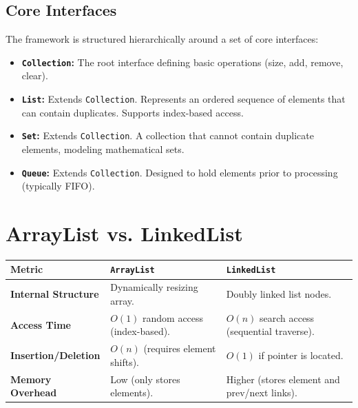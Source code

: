 \documentclass[12pt,a4paper]{article}
\renewcommand{\arraystretch}{1.45}
\begin{document}
\subsection{Core Interfaces}
The framework is structured hierarchically around a set of core interfaces:
\begin{itemize}[leftmargin=*, itemsep=4pt]
  \item \textbf{\texttt{Collection}:} The root interface defining basic operations (size, add, remove, clear).
  \item \textbf{\texttt{List}:} Extends \texttt{Collection}. Represents an ordered sequence of elements that can contain duplicates. Supports index-based access.
  \item \textbf{\texttt{Set}:} Extends \texttt{Collection}. A collection that cannot contain duplicate elements, modeling mathematical sets.
  \item \textbf{\texttt{Queue}:} Extends \texttt{Collection}. Designed to hold elements prior to processing (typically FIFO).
\end{itemize}

\section{ArrayList vs. LinkedList}

\par\noindent
{\renewcommand{\arraystretch}{1.5}%
\begin{tabularx}{\linewidth}{|B{3.2cm}|Y|Y|}
\hline
\textbf{Metric} & \textbf{\texttt{ArrayList}} & \textbf{\texttt{LinkedList}} \\
\hline
\textbf{Internal Structure} & Dynamically resizing array. & Doubly linked list nodes. \\
\hline
\textbf{Access Time} & $O(1)$ random access (index-based). & $O(n)$ search access (sequential traverse). \\
\hline
\textbf{Insertion/Deletion} & $O(n)$ (requires element shifts). & $O(1)$ if pointer is located. \\
\hline
\textbf{Memory Overhead} & Low (only stores elements). & Higher (stores element and prev/next links). \\
\hline
\end{tabularx}}
\end{document}
